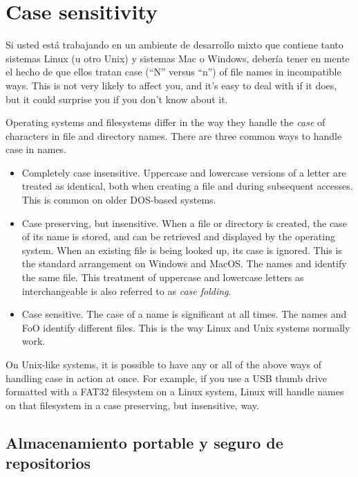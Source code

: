\section{Case sensitivity}
\label{sec:names:case}

Si usted está trabajando en un ambiente de desarrollo mixto que
contiene tanto sistemas Linux (u otro Unix) y sistemas Mac o Windows,
debería tener en mente el hecho de que ellos tratan 
case (``N'' versus ``n'') of file names in incompatible ways.  This is
not very likely to affect you, and it's easy to deal with if it does,
but it could surprise you if you don't know about it.

Operating systems and filesystems differ in the way they handle the
\emph{case} of characters in file and directory names.  There are
three common ways to handle case in names.
\begin{itemize}
\item Completely case insensitive.  Uppercase and lowercase versions
  of a letter are treated as identical, both when creating a file and
  during subsequent accesses.  This is common on older DOS-based
  systems.
\item Case preserving, but insensitive.  When a file or directory is
  created, the case of its name is stored, and can be retrieved and
  displayed by the operating system.  When an existing file is being
  looked up, its case is ignored.  This is the standard arrangement on
  Windows and MacOS.  The names  and 
  identify the same file.  This treatment of uppercase and lowercase
  letters as interchangeable is also referred to as \emph{case
    folding}.
\item Case sensitive.  The case of a name is significant at all times.
  The names  and {FoO} identify different files.  This
  is the way Linux and Unix systems normally work.
\end{itemize}

On Unix-like systems, it is possible to have any or all of the above
ways of handling case in action at once.  For example, if you use a
USB thumb drive formatted with a FAT32 filesystem on a Linux system,
Linux will handle names on that filesystem in a case preserving, but
insensitive, way.

\subsection{Almacenamiento portable y seguro de repositorios}

